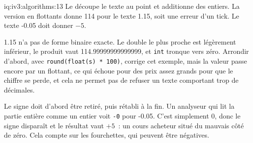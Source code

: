\begin{solution}{iq:iv3:algorithms:13}
Le  découpe le texte au point et additionne des entiers. La version en flottants donne 114 pour le texte 1.15, soit une erreur d'un tick. Le texte -0.05 doit donner $-5$.
\label{lst:iv3:al:ticks}

1.15 n'a pas de forme binaire exacte. Le double le plus proche est légèrement inférieur, le produit vaut 114.99999999999999, et \texttt{int} tronque vers zéro. Arrondir d'abord, avec \texttt{round(float(s) * 100)}, corrige cet exemple, mais la valeur passe encore par un flottant, ce qui échoue pour des prix assez grands pour que le chiffre se perde, et cela ne permet pas de refuser un texte comportant trop de décimales.

Le signe doit d'abord être retiré, puis rétabli à la fin. Un analyseur qui lit la partie entière comme un entier voit \texttt{-0} pour -0.05. C'est simplement 0, donc le signe disparaît et le résultat vaut $+5$~: un cours acheteur situé du mauvais côté de zéro. Cela compte sur les fourchettes, qui peuvent être négatives.

\end{solution}

